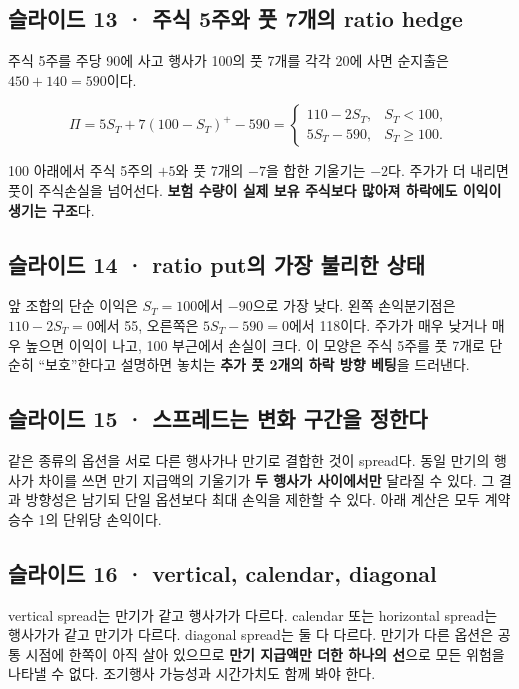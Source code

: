 \documentclass[11pt,a4paper]{article}
\begin{document}
\subsection{슬라이드 13 · 주식 5주와 풋 7개의 ratio hedge}
주식 5주를 주당 90에 사고 행사가 100의 풋 7개를 각각 20에 사면 순지출은 $450+140=590$이다.\par

\[
\Pi=5S_T+7(100-S_T)^+-590
=\begin{cases}110-2S_T,&S_T<100,\\5S_T-590,&S_T\geq100.\end{cases}
\]

100 아래에서 주식 5주의 $+5$와 풋 7개의 $-7$을 합한 기울기는 $-2$다. 주가가 더 내리면 풋이 주식손실을 넘어선다. \textbf{보험 수량이 실제 보유 주식보다 많아져 하락에도 이익이 생기는 구조}다.\par

\subsection{슬라이드 14 · ratio put의 가장 불리한 상태}
앞 조합의 단순 이익은 $S_T=100$에서 $-90$으로 가장 낮다. 왼쪽 손익분기점은 $110-2S_T=0$에서 55, 오른쪽은 $5S_T-590=0$에서 118이다. 주가가 매우 낮거나 매우 높으면 이익이 나고, 100 부근에서 손실이 크다. 이 모양은 주식 5주를 풋 7개로 단순히 “보호”한다고 설명하면 놓치는 \textbf{추가 풋 2개의 하락 방향 베팅}을 드러낸다.\par

\subsection{슬라이드 15 · 스프레드는 변화 구간을 정한다}
같은 종류의 옵션을 서로 다른 행사가나 만기로 결합한 것이 spread다. 동일 만기의 행사가 차이를 쓰면 만기 지급액의 기울기가 \textbf{두 행사가 사이에서만} 달라질 수 있다. 그 결과 방향성은 남기되 단일 옵션보다 최대 손익을 제한할 수 있다. 아래 계산은 모두 계약 승수 1의 단위당 손익이다.\par

\subsection{슬라이드 16 · vertical, calendar, diagonal}
vertical spread는 만기가 같고 행사가가 다르다. calendar 또는 horizontal spread는 행사가가 같고 만기가 다르다. diagonal spread는 둘 다 다르다. 만기가 다른 옵션은 공통 시점에 한쪽이 아직 살아 있으므로 \textbf{만기 지급액만 더한 하나의 선}으로 모든 위험을 나타낼 수 없다. 조기행사 가능성과 시간가치도 함께 봐야 한다.\par
\end{document}
